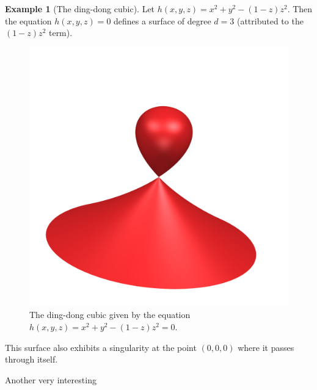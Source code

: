 \documentclass[a4paper]{article}
\theoremstyle{definition}
\newtheorem{exmpl}{Example}
\theoremstyle{plain}
\begin{document}
    \begin{exmpl}[The ding-dong cubic]
        Let $h(x, y, z) = x^2 + y^2 - (1 - z)z^2$. Then the equation $h(x, y,
        z) = 0$ defines a surface of degree $d = 3$ (attributed to the
        $(1-z)z^2$ term). 
        \begin{figure}[h!]
            \centering
            \includegraphics[width=0.3\linewidth]{../pictures/ding_dong.png}
            \caption{The ding-dong cubic given by the equation $h(x, y, z) =
            x^2 + y^2 - (1-z)z^2 = 0$.}
            \label{fig:../pictures/ding_dong}
        \end{figure}
        This surface also exhibits a singularity at the point $(0, 0, 0)$ where
        it passes through itself.
    \end{exmpl}
    
    Another very interesting  
\clearpage
\printbibliography
\end{document}

